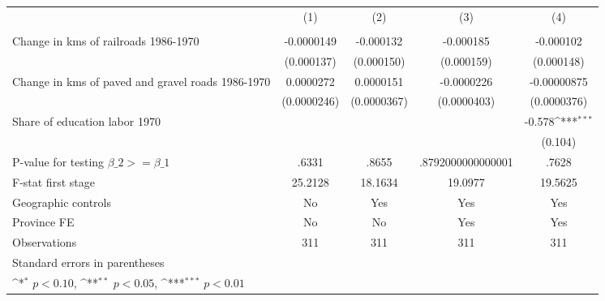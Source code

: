 {
\def\sym#1{\ifmmode^{#1}\else\(^{#1}\)\fi}
\begin{tabular}{l*{4}{c}}
\hline\hline
                &\multicolumn{1}{c}{(1)}&\multicolumn{1}{c}{(2)}&\multicolumn{1}{c}{(3)}&\multicolumn{1}{c}{(4)}\\
                &\multicolumn{1}{c}{}&\multicolumn{1}{c}{}&\multicolumn{1}{c}{}&\multicolumn{1}{c}{}\\
\hline
Change in kms of railroads 1986-1970&-0.0000149         &-0.000132         &-0.000185         &-0.000102         \\
                &(0.000137)         &(0.000150)         &(0.000159)         &(0.000148)         \\
[1em]
Change in kms of paved and gravel roads 1986-1970&0.0000272         &0.0000151         &-0.0000226         &-0.00000875         \\
                &(0.0000246)         &(0.0000367)         &(0.0000403)         &(0.0000376)         \\
[1em]
Share of education labor 1970&                  &                  &                  &   -0.578\sym{***}\\
                &                  &                  &                  &  (0.104)         \\
\hline
P-value for testing $\beta\_{2} >= \beta\_{1}$&    .6331         &    .8655         &.8792000000000001         &    .7628         \\
F-stat first stage&  25.2128         &  18.1634         &  19.0977         &  19.5625         \\
Geographic controls&       No         &      Yes         &      Yes         &      Yes         \\
Province FE     &       No         &       No         &      Yes         &      Yes         \\
Observations    &      311         &      311         &      311         &      311         \\
\hline\hline
\multicolumn{5}{l}{\footnotesize Standard errors in parentheses}\\
\multicolumn{5}{l}{\footnotesize \sym{*} \(p<0.10\), \sym{**} \(p<0.05\), \sym{***} \(p<0.01\)}\\
\end{tabular}
}
